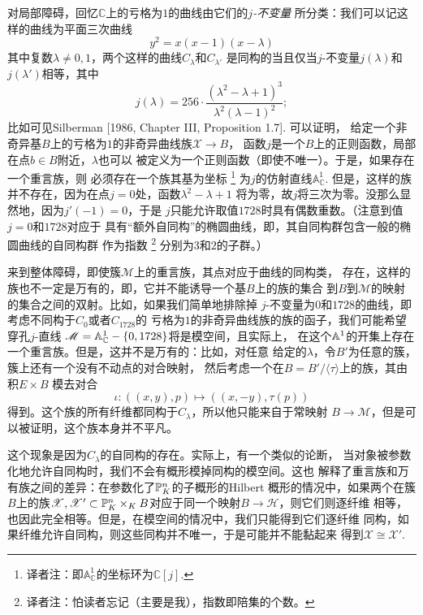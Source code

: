 对局部障碍，回忆$\mathbb C$上的亏格为$1$的曲线由它们的\emph{$j$-不变量}
所分类：我们可以记这样的曲线为平面三次曲线
\[
    y^2=x(x-1)(x-\lambda)
\]
其中复数$\lambda \neq 0,1$，两个这样的曲线$C_\lambda$和$C_{\lambda'}$
是同构的当且仅当$j$-不变量$j(\lambda)$和$j(\lambda')$相等，其中
\[
    j(\lambda)=256\cdot \frac{(\lambda^2-\lambda+1)^3}
    {\lambda^2(\lambda-1)^2};
\]
比如可见Silberman [1986, Chapter III, Proposition 1.7]. 可以证明，
给定一个非奇异基$B$上的亏格为$1$的非奇异曲线族$\mathscr X\to B$，
函数$j$是一个$B$上的正则函数，局部在点$b\in B$附近，$\lambda$也可以
被定义为一个正则函数（即使不唯一）。于是，如果存在一个重言族，则
必须存在一个族其基为坐标%
\footnote{译者注：即$\mathbb A_{\mathbb C}^1$的坐标环为$\mathbb C[j]$.}%
为$j$的仿射直线$\mathbb A_{\mathbb C}^1$.
但是，这样的族并不存在，因为在点$j=0$处，函数$\lambda^2-\lambda+1$
将为零，故$j$将三次为零。没那么显然地，因为$j'(-1)=0$，于是
$j$只能允许取值$1728$时具有偶数重数。（注意到值$j=0$和$1728$对应于
具有“额外自同构”的椭圆曲线，即，其自同构群包含一般的椭圆曲线的自同构群
作为指数%
\footnote{译者注：怕读者忘记（主要是我），指数即陪集的个数。}%
分别为$3$和$2$的子群。）


来到整体障碍，即使簇$\mathscr M$上的重言族，其点对应于曲线的同构类，
存在，这样的族也不一定是万有的，即，它并不能诱导一个基$B$上的族的集合
到$B$到$\mathscr M$的映射的集合之间的双射。比如，如果我们简单地排除掉
$j$-不变量为$0$和$1728$的曲线，即考虑不同构于$C_0$或者$C_{1728}$的
亏格为$1$的非奇异曲线族的族的函子，我们可能希望穿孔$j$-直线
$\mathscr M=\A_{\mathbb C}^1-\{0,1728\}$将是模空间，且实际上，
在这个$\A^1$的开集上存在一个重言族。但是，这并不是万有的：比如，对任意
给定的$\lambda$，令$B'$为任意的簇，簇上还有一个没有不动点的对合映射，
然后考虑一个在$B=B'/\langle \tau\rangle$上的族，其由积$E\times B$
模去对合
\[
    \iota:((x,y),p)\mapsto ((x,-y),\tau(p))
\]
得到。这个族的所有纤维都同构于$C_\lambda$，所以他只能来自于常映射
$B\to \mathscr M$，但是可以被证明，这个族本身并不平凡。

这个现象是因为$C_\lambda$的自同构的存在。实际上，有一个类似的论断，
当对象被参数化地允许自同构时，我们不会有概形模掉同构的模空间。这也
解释了重言族和万有族之间的差异：在参数化了$\P_K^n$的子概形的Hilbert
概形的情况中，如果两个在簇$B$上的族$\mathscr X,\mathscr X'\subset 
\P_K^n\times_K B$对应于同一个映射$B\to \mathscr H$，则它们则逐纤维
相等，也因此完全相等。但是，在模空间的情况中，我们只能得到它们逐纤维
同构，如果纤维允许自同构，则这些同构并不唯一，于是可能并不能黏起来
得到$\mathscr X\cong \mathscr X'$.

